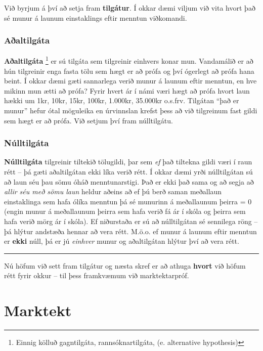 \documentclass[
]{book}
\begin{document}
Við byrjum á því að setja fram \textbf{tilgátur}. Í okkar dæmi viljum við
vita hvort það sé munur á launum einstaklings eftir menntun viðkomandi.

\hypertarget{auxf0altilguxe1ta}{%
\subsection{Aðaltilgáta}\label{auxf0altilguxe1ta}}

\textbf{Aðaltilgáta} \footnote{Einnig kölluð gagntilgáta, rannsóknartilgáta, (e.
  alternative hypothesis)} er sú tilgáta sem tilgreinir
einhvers konar mun. Vandamálið er að hún tilgreinir enga fasta tölu sem
hægt er að prófa og því ógerlegt að prófa hana beint. Í okkar dæmi gæti
sannarlega verið munur á launum eftir menntun, en hve mikinn mun ætti að
prófa? Fyrir hvert ár í námi væri hægt að prófa hvort laun hækki um 1kr,
10kr, 15kr, 100kr, 1.000kr, 35.000kr o.s.frv. Tilgátan ``það er munur''
hefur ótal möguleika en úrvinnslan krefst þess að við tilgreinum fast
gildi sem hægt er að prófa. Við setjum því fram núlltilgátu.

\hypertarget{nuxfalltilguxe1ta}{%
\subsection{Núlltilgáta}\label{nuxfalltilguxe1ta}}

\textbf{Núlltilgáta} tilgreinir tiltekið tölugildi, þar sem \emph{ef} það tiltekna
gildi væri í raun rétt -- þá gæti aðaltilgátan ekki líka verið rétt. Í
okkar dæmi yrði núlltilgátan sú að laun séu þau sömu óháð
menntunarstigi. Það er ekki það sama og að segja að \emph{allir séu með sömu
laun} heldur aðeins að ef þú berð saman meðallaun einstaklinga sem hafa
ólíka menntun þá sé munurinn á meðallaunum þeirra = 0 (engin munur á
meðallaunum þeirra sem hafa verið fá ár í skóla og þeirra sem hafa verið
mörg ár í skóla). Ef niðurstaða er sú að núlltilgátan sé sennilega röng
-- þá hlýtur andstæða hennar að vera rétt. M.ö.o. ef munur á launum
eftir menntun er \textbf{ekki} núll, þá er jú \emph{einhver} munur og aðaltilgátan
hlýtur því að vera rétt.

\begin{center}\rule{0.5\linewidth}{0.5pt}\end{center}

Nú höfum við sett fram tilgátur og næsta skref er að athuga \textbf{hvort}
við höfum rétt fyrir okkur -- til þess framkvæmum við marktektarpróf.

\hypertarget{marktekt}{%
\chapter{Marktekt}\label{marktekt}}
\end{document}
